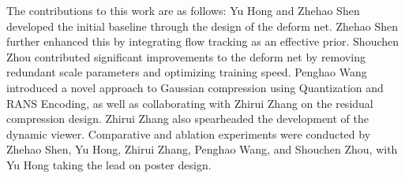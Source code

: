The contributions to this work are as follows: Yu Hong and Zhehao Shen developed the initial baseline through the design of the deform net. Zhehao Shen further enhanced this by integrating flow tracking as an effective prior. Shouchen Zhou contributed significant improvements to the deform net by removing redundant scale parameters and optimizing training speed. Penghao Wang introduced a novel approach to Gaussian compression using Quantization and RANS Encoding, as well as collaborating with Zhirui Zhang on the residual compression design. Zhirui Zhang also spearheaded the development of the dynamic viewer. Comparative and ablation experiments were conducted by Zhehao Shen, Yu Hong, Zhirui Zhang, Penghao Wang, and Shouchen Zhou, with Yu Hong taking the lead on poster design.

